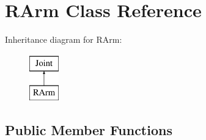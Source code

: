 \hypertarget{class_r_arm}{\section{R\-Arm Class Reference}
\label{class_r_arm}
}
Inheritance diagram for R\-Arm\-:\begin{figure}[H]
\begin{center}
\leavevmode
\includegraphics[height=2.000000cm]{class_r_arm}
\end{center}
\end{figure}
\subsection*{Public Member Functions}
